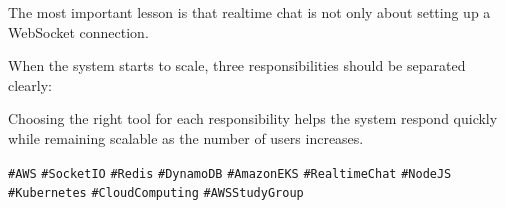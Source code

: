 The most important lesson is that realtime chat is not only about
setting up a WebSocket connection.

When the system starts to scale, three responsibilities should be
separated clearly:

\begin{Shaded}
\begin{Highlighting}[]


\end{Highlighting}
\end{Shaded}

Choosing the right tool for each responsibility helps the system respond
quickly while remaining scalable as the number of users increases.

\texttt{\#AWS} \texttt{\#SocketIO} \texttt{\#Redis} \texttt{\#DynamoDB}
\texttt{\#AmazonEKS} \texttt{\#RealtimeChat} \texttt{\#NodeJS}
\texttt{\#Kubernetes} \texttt{\#CloudComputing} \texttt{\#AWSStudyGroup}
